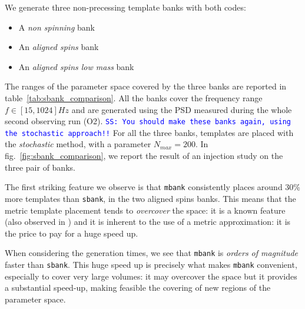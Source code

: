 \documentclass[twocolumn,showpacs,preprintnumbers,nofootinbib,prd,
superscriptaddress,10pt]{revtex4-2}
\newcommand{\stefano}[1]{{\textcolor{blue}{\texttt{SS: #1}} }}
\begin{document}
We generate three non-precessing template banks with both codes:
\begin{itemize}
	\item A {\it non spinning} bank
	\item An {\it aligned spins} bank
	\item An {\it aligned spins low mass} bank
\end{itemize}
The ranges of the parameter space covered by the three banks are reported in table~\ref{tab:sbank_comparison}. All the banks cover the frequency range $f\in [15,1024] Hz$ and are generated using the PSD measured during the whole second observing run (O2).
\stefano{You should make these banks again, using the stochastic approach!!}
For all the three banks, templates are placed with the {\it stochastic} method, with a parameter $N_{max}=200$. In fig.~\ref{fig:sbank_comparison}, we report the result of an injection study on the three pair of banks.

The first striking feature we observe is that \texttt{mbank} consistently places around 30\% more templates than \texttt{sbank}, in the two aligned spins banks. This means that the metric template placement tends to \textit{overcover} the space: it is a known feature (also observed in \cite{Coogan:2022qxs}) and it is inherent to the use of a metric approximation: it is the price to pay for a huge speed up.


When considering the generation times, we see that \texttt{mbank} is {\it orders of magnitude} faster than \texttt{sbank}. This huge speed up is precisely what makes \texttt{mbank} convenient, especially to cover very large volumes: it may overcover the space but it provides a substantial speed-up, making feasible the covering of new regions of the parameter space.

\end{document}
